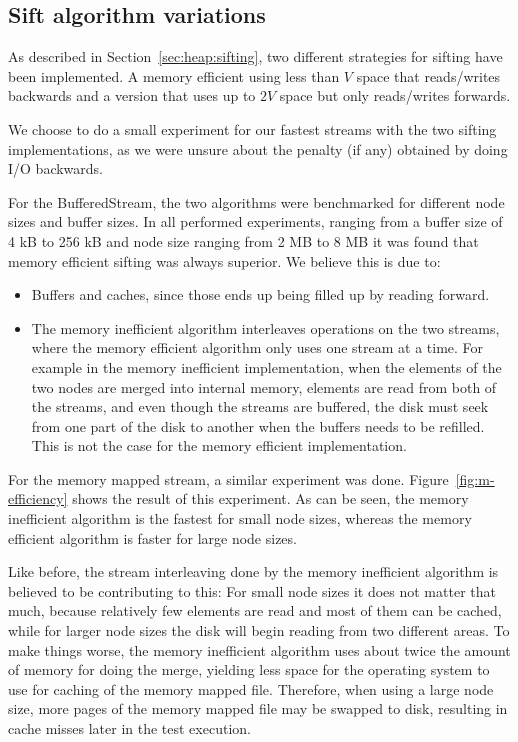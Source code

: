 
\subsection{Sift algorithm variations}
\label{sec:sifting}
As described in Section~\ref{sec:heap:sifting}, two different strategies for sifting have been implemented. A memory efficient using less than $V$ space that reads/writes backwards and a version that uses up to $2V$ space but only reads/writes forwards.

We choose to do a small experiment for our fastest streams with the two sifting implementations, as we were unsure about the penalty (if any) obtained by doing I/O backwards.

For the BufferedStream, the two algorithms were benchmarked for different node sizes and buffer sizes. In all performed experiments, ranging from a buffer size of 4 kB to 256 kB and node size ranging from 2 MB to 8 MB it was found that memory efficient sifting was always superior. We believe this is due to:

\begin{itemize}
\item Buffers and caches, since those ends up being filled up by reading forward.
\item The memory inefficient algorithm interleaves operations on the two streams, where the memory efficient algorithm only uses one stream at a time. For example in the memory inefficient implementation, when the elements of the two nodes are merged into internal memory, elements are read from both of the streams, and even though the streams are buffered, the disk must seek from one part of the disk to another when the buffers needs to be refilled. This is not the case for the memory efficient implementation.
\end{itemize}

For the memory mapped stream, a similar experiment was done. Figure~\ref{fig:m-efficiency} shows the result of this experiment. As can be seen, the memory inefficient algorithm is the fastest for small node sizes, whereas the memory efficient algorithm is faster for large node sizes.

Like before, the stream interleaving done by the memory inefficient algorithm is believed to be contributing to this: For small node sizes it does not matter that much, because relatively few elements are read and most of them can be cached, while for larger node sizes the disk will begin reading from two different areas. To make things worse, the memory inefficient algorithm uses about twice the amount of memory for doing the merge, yielding less space for the operating system to use for caching of the memory mapped file. Therefore, when using a large node size, more pages of the memory mapped file may be swapped to disk, resulting in cache misses later in the test execution.

